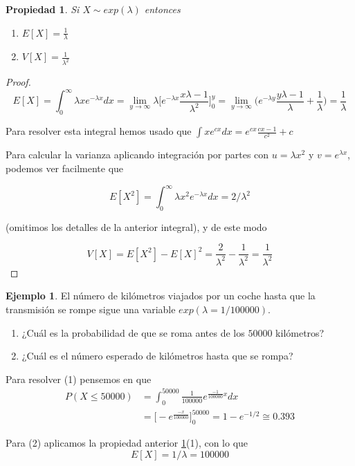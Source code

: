 \documentclass[]{book}
\theoremstyle{plain}
\newtheorem{property}[theorem]{Propiedad}
\theoremstyle{definition}
\newtheorem{example}[theorem]{Ejemplo}
\theoremstyle{definition} %
\begin{document}
\begin{property}\label{prop_exp_mean}
  Si $X \sim  exp(\lambda)$ entonces 
  \begin{enumerate}
    \item $E[X] = \frac{1}{\lambda}$
    \item $V[X] = \frac{1}{\lambda^2}$
  \end{enumerate}
\end{property}

\begin{proof}
  \[E[X] = \int^{\infty}_{0} \lambda x e^{-\lambda x} dx 
  = \lim_{y\to \infty}\lambda \bigg[ e^{-\lambda x} \frac{x \lambda -1}{\lambda^2}\bigg]^y_0 = \lim_{y\to \infty} \big( e^{-\lambda y }\frac{y\lambda -1}{\lambda} + \frac{1}{\lambda}\big) = \frac{1}{\lambda} \]

  Para resolver esta integral hemos usado que $\int x e^{cx} dx = e^{c x } \frac{c x - 1}{c ^2} + c$

  Para calcular la varianza aplicando integración por partes con $u = \lambda x^2$ y $v = e^{\lambda x }$, podemos ver facilmente que 

  \[E[X^2] = \int^{\infty}_{0} \lambda x^2 e^{-\lambda x} dx = 2/\lambda^2\]

  (omitimos los detalles de la anterior integral), y de este modo
  
  \[V[X] = E[X^2] - E[X]^2 = \frac{2}{\lambda^2} - \frac{1}{\lambda^2} = \frac{1}{\lambda^2}\]
\end{proof}


\begin{example}
  El número de kilómetros viajados por un coche hasta que la transmisión se rompe sigue una variable
  $exp(\lambda= 1/100 000)$. 
  \begin{enumerate}[(1)]
    \item ¿Cuál es la probabilidad de que se roma antes de los $50000$ kilómetros?
    \item ¿Cuál es el número esperado de kilómetros hasta que se rompa?
  \end{enumerate}

  Para resolver (1) pensemos en que 
  \begin{align*}
    P(X\leq 50000) &= \int^{50000}_0 \frac{1}{100000} e ^{\frac{-1}{100000}x} dx\\
    &=\big[ - e^{\frac{-x}{100000}}\big]^{50000}_0  = 1 - e^{-1/2} \cong 0.393
  \end{align*}

  Para (2) aplicamos la propiedad anterior \ref{prop_exp_mean}(1), con lo que 
  \[E[X] = 1/\lambda = 100000\] 
 
\end{example}
\end{document}
